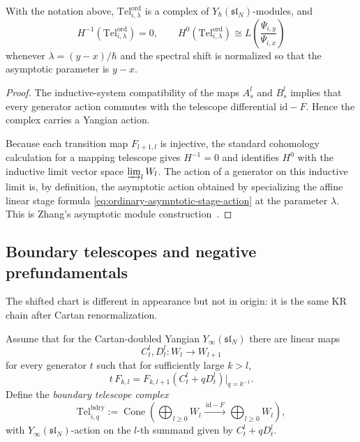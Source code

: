 \begin{theorem}
\ClaimStatusProvedHere
\label{thm:derived-realization-ordinary-asymptotic}
With the notation above, $\mathrm{Tel}^{\mathrm{ord}}_{i,\lambda}$ is a
complex of $Y_\hbar(\mathfrak{sl}_N)$-modules, and
\begin{equation}
H^{-1}(\mathrm{Tel}^{\mathrm{ord}}_{i,\lambda})=0,
\qquad
H^0(\mathrm{Tel}^{\mathrm{ord}}_{i,\lambda})
\cong
L\!\left(\frac{\Psi_{i,y}}{\Psi_{i,x}}\right)
\end{equation}
whenever $\lambda=(y-x)/\hbar$ and the spectral shift is normalized so
that the asymptotic parameter is $y-x$.
\end{theorem}

\begin{proof}
The inductive-system compatibility of the maps $A_s^l$ and $B_s^l$ implies
that every generator action commutes with the telescope differential
$\mathrm{id}-F$. Hence the complex carries a Yangian action.

Because each transition map $F_{l+1,l}$ is injective, the standard
cohomology calculation for a mapping telescope gives
$H^{-1}=0$ and identifies $H^0$ with the inductive limit vector space
$\varinjlim_l W_l$. The action of a generator on this inductive limit is,
by definition, the asymptotic action obtained by specializing the affine
linear stage formula \eqref{eq:ordinary-asymptotic-stage-action} at the
parameter $\lambda$. This is Zhang's asymptotic module
construction~\cite{Zhang24}.
\end{proof}

\subsection{Boundary telescopes and negative prefundamentals}

The shifted chart is different in appearance but not in origin: it is the
same KR chain after Cartan renormalization.

\begin{definition}
\label{def:boundary-telescope}
Assume that for the Cartan-doubled Yangian $Y_\infty(\mathfrak{sl}_N)$
there are linear maps
\begin{equation}
C_t^l,D_t^l:W_l\longrightarrow W_{l+1}
\end{equation}
for every generator $t$ such that for sufficiently large $k>l$,
\begin{equation}
\label{eq:boundary-stage-action}
t\,F_{k,l}=F_{k,l+1}(C_t^l+qD_t^l)\big|_{q=k^{-1}}.
\end{equation}
Define the \emph{boundary telescope complex}
\begin{equation}
\mathrm{Tel}^{\mathrm{bdry}}_{i,q}
:=
\operatorname{Cone}\!\left(
\bigoplus_{l\ge 0}W_l
\xrightarrow{\ \mathrm{id}-F\ }
\bigoplus_{l\ge 0}W_l
\right),
\end{equation}
with $Y_\infty(\mathfrak{sl}_N)$-action on the $l$-th summand given by
$C_t^l+qD_t^l$.
\end{definition}

